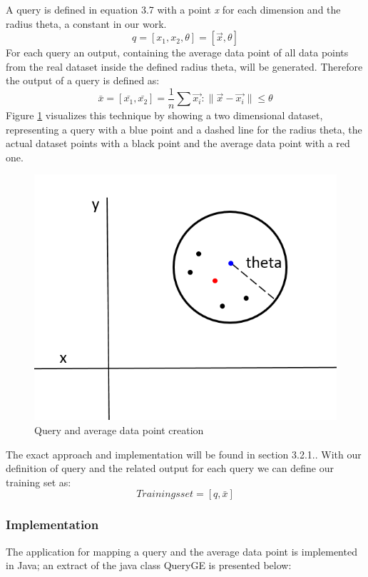\documentclass{lmproj}
\begin{document}
A query is defined in equation 3.7 with a point \textit{x} for each dimension and the radius theta, a constant in our work.  
\begin{equation}
q=[x_1,x_2,\theta] =[\vec{x},\theta]
\end{equation}
For each query an output, containing the average data point of all data points from the real dataset inside the defined radius theta, will be generated. Therefore the output of a query is defined as:
\begin{equation}
\bar{x}=[\bar{x_1},\bar{x_2}]=\frac{1}{n}\sum \vec{x_i}:\parallel \vec{x}-\vec{x_i}\parallel \leq \theta
\end{equation}
Figure \ref{fig:Query} visualizes this technique by showing a two dimensional dataset, representing a query with a blue point and a dashed line for the radius theta, the actual dataset points with a black point and the average data point with a red one.
 \begin{figure}[ht]
	\centering
	\includegraphics[width=0.5\linewidth]{Query.PNG}
	\caption[Query]{Query and average data point creation}
	\label{fig:Query}
\end{figure}

The exact approach and implementation will be found in section 3.2.1.. With our definition of query and the related output for each query we can define our training set as:
\begin{equation}
Trainingsset=[q,\bar{x}]
\end{equation}

\subsubsection{Implementation}

The application for mapping a query and the average data point is implemented in Java; an extract of the java class QueryGE is presented below:


\end{document}
